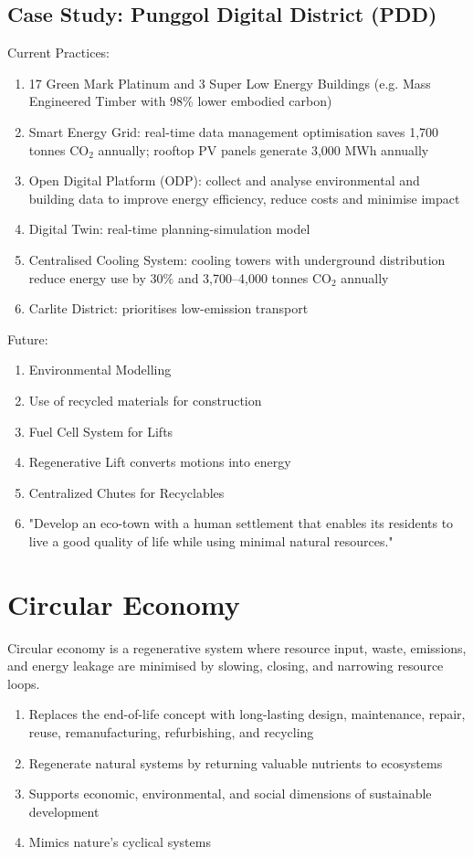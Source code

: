\documentclass[12pt, a4paper]{article}
\begin{document}
\begin{multicols*}{3}
\subsection{Case Study: Punggol Digital District (PDD)}
Current Practices:
\begin{enumerate}[\roman*.]
  \item 17 Green Mark Platinum and 3 Super Low Energy Buildings (e.g. Mass Engineered Timber with 98\% lower embodied carbon)
  \item Smart Energy Grid: real-time data management optimisation saves 1,700 tonnes CO$_2$ annually; rooftop PV panels generate 3,000 MWh annually
  \item Open Digital Platform (ODP): collect and analyse environmental and building data to improve energy efficiency, reduce costs and minimise impact
  \item Digital Twin: real-time planning-simulation model
  \item Centralised Cooling System: cooling towers with underground distribution reduce energy use by $30\%$ and 3,700--4,000 tonnes CO$_2$ annually
  \item Carlite District: prioritises low-emission transport
\end{enumerate}

Future:
\begin{enumerate}[\roman*.]
  \item Environmental Modelling
  \item Use of recycled materials for construction
  \item Fuel Cell System for Lifts 
  \item Regenerative Lift converts motions into energy
  \item Centralized Chutes for Recyclables
  \item "Develop an eco-town with a human settlement that enables its residents to live a
good quality of life while using minimal natural resources."
\end{enumerate}

\colbreak
\section{Circular Economy}
Circular economy is a regenerative system where resource input, waste, emissions, and energy leakage are minimised by slowing, closing, and narrowing resource loops.  
\begin{enumerate}[\roman*.]
  \item Replaces the end-of-life concept with long-lasting design, maintenance, repair, reuse, remanufacturing, refurbishing, and recycling
  \item Regenerate natural systems by returning valuable nutrients to ecosystems
  \item Supports economic, environmental, and social dimensions of sustainable development
  \item Mimics nature's cyclical systems 
\end{enumerate}


\end{multicols*}
\end{document}
